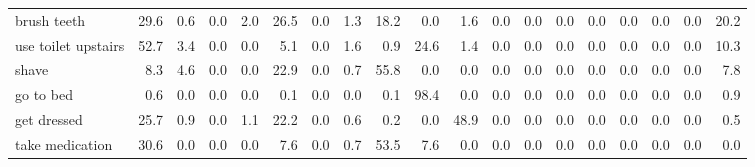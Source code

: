 \documentclass{article}
\begin{document}
\begin{sideways}
\begin{tabular}{lrrrrrrrrrrrrrrrrrr}
brush teeth                   &        29.6 &                0.6 &           0.0 &                          2.0 &               26.5 &                0.0 &                        1.3 &         18.2 &              0.0 &                1.6 &                    0.0 &                      0.0 &                  0.0 &                   0.0 &              0.0 &              0.0 &                                  0.0 &         20.2 \\
use toilet upstairs           &        52.7 &                3.4 &           0.0 &                          0.0 &                5.1 &                0.0 &                        1.6 &          0.9 &             24.6 &                1.4 &                    0.0 &                      0.0 &                  0.0 &                   0.0 &              0.0 &              0.0 &                                  0.0 &         10.3 \\
shave                         &         8.3 &                4.6 &           0.0 &                          0.0 &               22.9 &                0.0 &                        0.7 &         55.8 &              0.0 &                0.0 &                    0.0 &                      0.0 &                  0.0 &                   0.0 &              0.0 &              0.0 &                                  0.0 &          7.8 \\
go to bed                     &         0.6 &                0.0 &           0.0 &                          0.0 &                0.1 &                0.0 &                        0.0 &          0.1 &             98.4 &                0.0 &                    0.0 &                      0.0 &                  0.0 &                   0.0 &              0.0 &              0.0 &                                  0.0 &          0.9 \\
get dressed                   &        25.7 &                0.9 &           0.0 &                          1.1 &               22.2 &                0.0 &                        0.6 &          0.2 &              0.0 &               48.9 &                    0.0 &                      0.0 &                  0.0 &                   0.0 &              0.0 &              0.0 &                                  0.0 &          0.5 \\
take medication               &        30.6 &                0.0 &           0.0 &                          0.0 &                7.6 &                0.0 &                        0.7 &         53.5 &              7.6 &                0.0 &                    0.0 &                      0.0 &                  0.0 &                   0.0 &              0.0 &              0.0 &                                  0.0 &          0.0 \\

\end{tabular}
\end{sideways}
\end{document}
